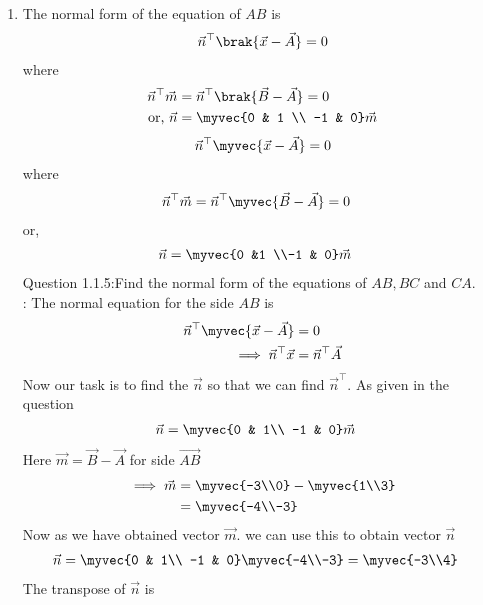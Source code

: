 \documentclass[11pt]{book}
\begin{document}
\begin{enumerate}[label=\thesection.\arabic*.,ref=\thesection.\theenumi]
\item The normal form of the equation of $AB$  is 
		\begin{align}
			\vec{n}^{\top}\brak{	\vec{x}-\vec{A}} = 0
		\end{align}
		where 
		\begin{align}
			\vec{n}^{\top}\vec{m}&=\vec{n}^{\top}\brak{\vec{B}-\vec{A}} = 0
			\\
			\text{or, } \vec{n}&=\myvec{0 & 1 \\ -1 & 0} \vec{m}
		\end{align}
  \begin{align}
\vec{n}^{\top}\myvec{\vec{x}-\vec{A}}=0
\end{align}
where
\begin{align}
\vec{n}^{\top}\vec{m}&=\vec{n}^{\top}\myvec{\vec{B}-\vec{A}}=0
\end{align}	
or,\begin{align}
\vec{n}&=\myvec{0 &1 \\-1 & 0}\vec{m}
\end{align}
Question 1.1.5:Find the normal form of the equations of $AB, BC$ and $CA$.\\
\solution:
       The normal equation for the side $AB$ is
\begin{align}
\vec{n}^{\top}\myvec{\vec{x}-\vec{A}}&=0\\
\implies
\vec{n}^{\top}\vec{x}&=\vec{n}^{\top}\vec{A}
\end{align}
Now our task is to find the $\vec{n}$ so that we can find $\vec{n}^{\top}$.
As given in the question 
\begin{align}
  \vec{n} &= \myvec{0 & 1\\
  -1 & 0}\vec{m}
\end{align}
Here $\vec{m} = \vec{B}- \vec{A}$ for side $\vec{AB}$
\begin{align}
\implies
\vec{m}&=\myvec{-3\\0} - \myvec{1\\3}\\
&=\myvec{-4\\-3}
\end{align}
Now as we have obtained vector $\vec{m}$.
we can use this to obtain vector $\vec{n}$
\begin{align}
\vec{n} &= \myvec{0 & 1\\
  -1 & 0}\myvec{-4\\-3}
 = \myvec{-3\\4}
\end{align}
The transpose of $\vec{n}$ is
\begin{align}

\end{align}
\end{enumerate}
\end{document}
